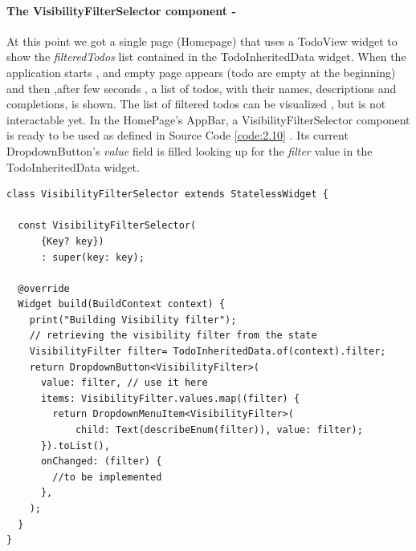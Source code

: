 \paragraph{The VisibilityFilterSelector component - }
\label{subpar:todo_app_inherited_widget_visibilityfiltercomponent_component}
At this point we got a single page (Homepage) that uses a TodoView widget to show the \textit{filteredTodos} list contained in the TodoInheritedData widget. When the application starts , and empty page appears (todo are empty at the beginning) and then ,after few seconds , a list of todos, with their names, descriptions and completions, is shown. The list of filtered todos can be visualized , but is not interactable yet. 
In the HomePage’s AppBar, a VisibilityFilterSelector component is ready to be used as defined in Source Code \ref{code:2.10} . Its current DropdownButton’s \textit{value} field is filled looking up for the \textit{filter} value in the TodoInheritedData widget. 
\mbox{}\\
\begin{code}

 \mbox{}

\label{code:2.23}
\begin{verbatim}
class VisibilityFilterSelector extends StatelessWidget {

  const VisibilityFilterSelector(
      {Key? key})
      : super(key: key);

  @override
  Widget build(BuildContext context) {
    print("Building Visibility filter");
    // retrieving the visibility filter from the state
    VisibilityFilter filter= TodoInheritedData.of(context).filter;
    return DropdownButton<VisibilityFilter>(
      value: filter, // use it here
      items: VisibilityFilter.values.map((filter) {
        return DropdownMenuItem<VisibilityFilter>(
            child: Text(describeEnum(filter)), value: filter);
      }).toList(),
      onChanged: (filter) {
        //to be implemented
      },
    );
  }
}
\end{verbatim}
\end{code}
\mbox{}\\
